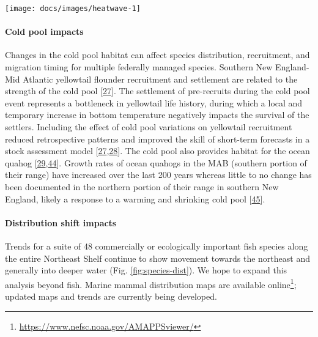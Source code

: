 \documentclass[
  10pt,
]{article}
\let\origfigure\figure
\let\endorigfigure\endfigure
\renewenvironment{figure}[1][2] {
    \expandafter\origfigure\expandafter[H]
} {
    \endorigfigure
}
\begin{document}
\begin{figure}

{\centering \texttt{[image: docs/images/heatwave-1]} 

}

\caption{Marine heatwave cumulative intesity (left) and maximum intensity (right) in the Mid-Atlantic Bight.}\label{fig:heatwave}
\end{figure}

\hypertarget{cold-pool-impacts}{%
\paragraph{Cold pool impacts}\label{cold-pool-impacts}}

Changes in the cold pool habitat can affect species distribution,
recruitment, and migration timing for multiple federally managed
species. Southern New England-Mid Atlantic yellowtail flounder
recruitment and settlement are related to the strength of the cold pool
{[}\protect\hyperlink{ref-miller_state-space_2016}{27}{]}. The
settlement of pre-recruits during the cold pool event represents a
bottleneck in yellowtail life history, during which a local and
temporary increase in bottom temperature negatively impacts the survival
of the settlers. Including the effect of cold pool variations on
yellowtail recruitment reduced retrospective patterns and improved the
skill of short-term forecasts in a stock assessment model
{[}\protect\hyperlink{ref-miller_state-space_2016}{27},\protect\hyperlink{ref-du_pontavice_incorporating_nodate}{28}{]}.
The cold pool also provides habitat for the ocean quahog
{[}\protect\hyperlink{ref-friedland_middle_2022}{29},\protect\hyperlink{ref-powell_ocean_2020}{44}{]}.
Growth rates of ocean quahogs in the MAB (southern portion of their
range) have increased over the last 200 years whereas little to no
change has been documented in the northern portion of their range in
southern New England, likely a response to a warming and shrinking cold
pool {[}\protect\hyperlink{ref-pace_two-hundred_2018}{45}{]}.

\hypertarget{distribution-shift-impacts}{%
\paragraph{Distribution shift
impacts}\label{distribution-shift-impacts}}

Trends for a suite of 48 commercially or ecologically important fish
species along the entire Northeast Shelf continue to show movement
towards the northeast and generally into deeper water (Fig.
\ref{fig:species-dist}). We hope to expand this analysis beyond fish.
Marine mammal distribution maps are available online\footnote{\url{https://www.nefsc.noaa.gov/AMAPPSviewer/}};
updated maps and trends are currently being developed.
\end{document}
